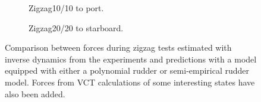 \begin{figure}
     \centering
     \begin{subfigure}[b]{\textwidth}
         \centering
         
        \caption{Zigzag10/10 to port.}
        \label{fig:ID_wPCC_10}
     \end{subfigure}
     \vfill
     \begin{subfigure}[b]{\textwidth}
         
        \caption{Zigzag20/20 to starboard.}
        \label{fig:ID_wPCC_20}
     \end{subfigure}
        \caption{Comparison between forces during zigzag tests estimated with inverse dynamics from the experiments and predictions with a model equipped with either a polynomial rudder or semi-empirical rudder model. Forces from VCT calculations of some interesting states have also been added.}
        \label{fig:ID_wPCC}
\end{figure}